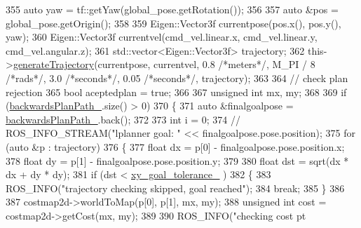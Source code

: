 \begin{DoxyCode}
{355     \textcolor{keyword}{auto} yaw = tf::getYaw(global\_pose.getRotation());
356 
357     \textcolor{keyword}{auto} &pos = global\_pose.getOrigin();
358 
359     Eigen::Vector3f currentpose(pos.x(), pos.y(), yaw);
360     Eigen::Vector3f currentvel(cmd\_vel.linear.x, cmd\_vel.linear.y, cmd\_vel.angular.z);
361     std::vector<Eigen::Vector3f> trajectory;
362     this->\hyperlink{classmove__base__z__client_1_1backward__local__planner_1_1BackwardLocalPlanner_a5da53f29e43639a9af5ba3b640e6bf8c}{generateTrajectory}(currentpose, currentvel, 0.8 \textcolor{comment}{/*meters*/}, M\_PI / 8 \textcolor{comment}{/*rads*/}, 
      3.0 \textcolor{comment}{/*seconds*/}, 0.05 \textcolor{comment}{/*seconds*/}, trajectory);
363 
364     \textcolor{comment}{// check plan rejection}
365     \textcolor{keywordtype}{bool} aceptedplan = \textcolor{keyword}{true};
366 
367     \textcolor{keywordtype}{unsigned} \textcolor{keywordtype}{int} mx, my;
368     
369     \textcolor{keywordflow}{if} (\hyperlink{classmove__base__z__client_1_1backward__local__planner_1_1BackwardLocalPlanner_a451add2af7d6d83a7415277311b3ed04}{backwardsPlanPath\_}.size() > 0)
370     \{
371         \textcolor{keyword}{auto} &finalgoalpose = \hyperlink{classmove__base__z__client_1_1backward__local__planner_1_1BackwardLocalPlanner_a451add2af7d6d83a7415277311b3ed04}{backwardsPlanPath\_}.back();
372         
373         \textcolor{keywordtype}{int} i = 0;
374         \textcolor{comment}{// ROS\_INFO\_STREAM("lplanner goal: " << finalgoalpose.pose.position);}
375         \textcolor{keywordflow}{for} (\textcolor{keyword}{auto} &p : trajectory)
376         \{
377             \textcolor{keywordtype}{float} dx = p[0] - finalgoalpose.pose.position.x;
378             \textcolor{keywordtype}{float} dy = p[1] - finalgoalpose.pose.position.y;
379 
380             \textcolor{keywordtype}{float} dst = sqrt(dx * dx + dy * dy);
381             \textcolor{keywordflow}{if} (dst < \hyperlink{classmove__base__z__client_1_1backward__local__planner_1_1BackwardLocalPlanner_a89ab1ee7283a474dc19970789f51c087}{xy\_goal\_tolerance\_} )
382             \{
383                 ROS\_INFO(\textcolor{stringliteral}{"trajectory checking skipped, goal reached"});
384                 \textcolor{keywordflow}{break};
385             \}
386 
387             costmap2d->worldToMap(p[0], p[1], mx, my);
388             \textcolor{keywordtype}{unsigned} \textcolor{keywordtype}{int} cost = costmap2d->getCost(mx, my);
389 
390             ROS\_INFO(\textcolor{stringliteral}{"checking cost pt %
}}
\end{DoxyCode}
